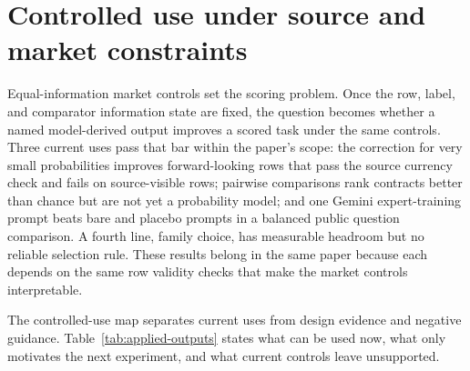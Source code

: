 \documentclass[11pt]{article}
\begin{document}
\section{Controlled use under source and market constraints}
\label{sec:controlled-use}

Equal-information market controls set the scoring problem. Once the row, label, and comparator information state are fixed, the question becomes whether a named model-derived output improves a scored task under the same controls. Three current uses pass that bar within the paper's scope: the correction for very small probabilities improves forward-looking rows that pass the source currency check and fails on source-visible rows; pairwise comparisons rank contracts better than chance but are not yet a probability model; and one Gemini expert-training prompt beats bare and placebo prompts in a balanced public question comparison. A fourth line, family choice, has measurable headroom but no reliable selection rule. These results belong in the same paper because each depends on the same row validity checks that make the market controls interpretable.

The controlled-use map separates current uses from design evidence and negative guidance. Table~\ref{tab:applied-outputs} states what can be used now, what only motivates the next experiment, and what current controls leave unsupported.
\end{document}
